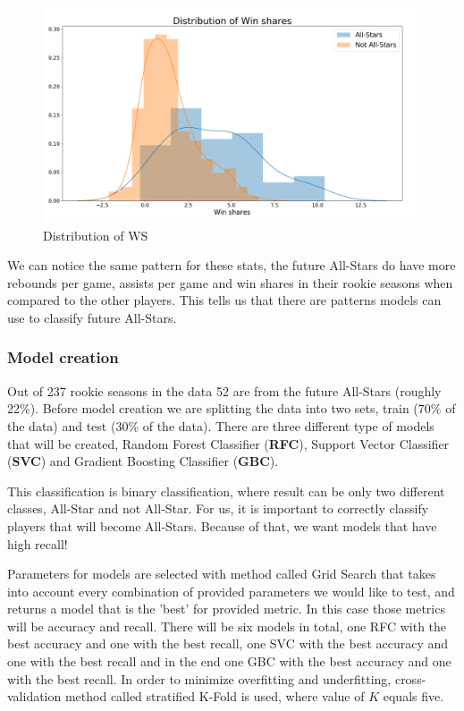 \documentclass[a4paper]{article}
\begin{document}
\begin{figure}[h!]
\begin{center}
\includegraphics[scale=0.31]{ws_all_star.png}
\end{center}
\caption{Distribution of WS}
\label{plt:ws_all_star}
\end{figure}

We can notice the same pattern for these stats, the future All-Stars do have more rebounds per game, assists per game and win shares in their rookie seasons when compared to the other players. This tells us that there are patterns models can use to classify future All-Stars.

\subsubsection{Model creation}
\label{subsubsec:model_creation_all_star}

Out of 237 rookie seasons in the data 52 are from the future All-Stars (roughly 22\%). Before model creation we are splitting the data into two sets, train (70\% of the data) and test (30\% of the data). There are three different type of models that will be created, Random Forest Classifier (\textbf{RFC}), Support Vector Classifier (\textbf{SVC}) and Gradient Boosting Classifier (\textbf{GBC}).

This classification is binary classification, where result can be only two different classes, All-Star and not All-Star. For us, it is important to correctly classify players that will become All-Stars. Because of that, we want models that have high recall!

Parameters for models are selected with method called Grid Search that takes into account every combination of provided parameters we would like to test, and returns a model that is the 'best' for provided metric. In this case those metrics will be accuracy and recall. There will be six models in total, one RFC with the best accuracy and one with the best recall, one SVC with the best accuracy and one with the best recall and in the end one GBC with the best accuracy and one with the best recall. In order to minimize overfitting and underfitting, cross-validation method called stratified K-Fold \cite{crossVal} is used, where value of $K$ equals five.
\end{document}
